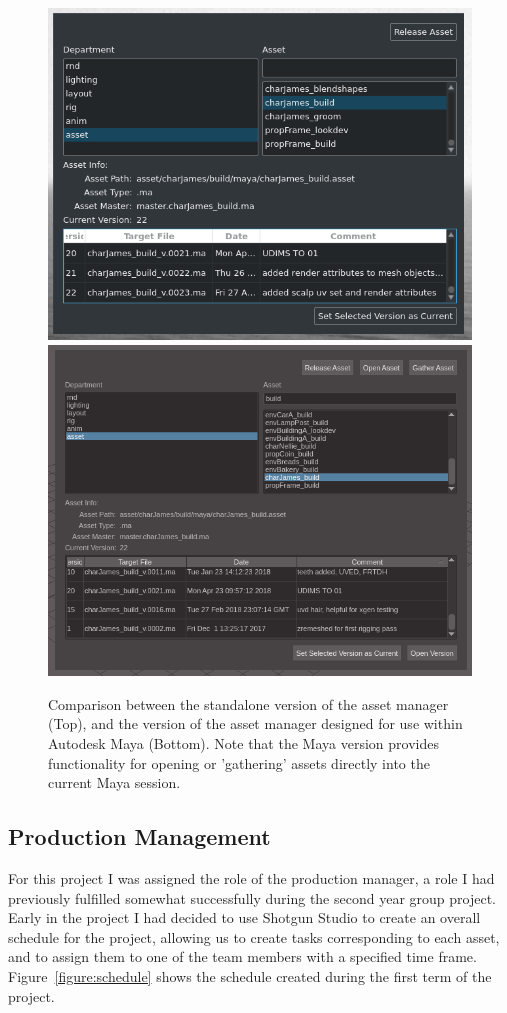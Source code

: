 \documentclass[11pt]{article}
\begin{document}
\begin{figure}[htbp]
\centering
\includegraphics[width=0.8\linewidth]{images/amStandalone.png}
\includegraphics[width=0.8\linewidth]{images/amGuiMaya.png}
\caption{\label{figure:assetManagerGui} Comparison between the standalone version of the asset manager (Top), and the version of the asset manager designed for use within Autodesk Maya (Bottom). Note that the Maya version provides functionality for opening or 'gathering' assets directly into the current Maya session.}
\end{figure}

\subsection{Production Management}

For this project I was assigned the role of the production manager, a role I had previously fulfilled somewhat successfully during the second year group project. Early in the project I had decided to use Shotgun Studio to create an overall schedule for the project, allowing us to create tasks corresponding to each asset, and to assign them to one of the team members with a specified time frame. Figure~\ref{figure:schedule} shows the schedule created during the first term of the project.
\end{document}
